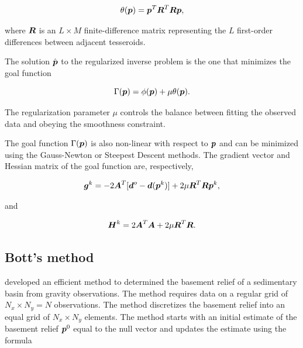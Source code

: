 \documentclass[extra]{gji}
\newcommand{\mbf}[1]{\hbox{\mathversion{bold}$#1$}}
\begin{document}
\begin{equation}
    \theta(\mbf{p}) = \mbf{p}^T\mbf{R}^T\mbf{R}\mbf{p},
\end{equation}

\noindent where $\mbf{R}$ is an $L \times M$ finite-difference matrix
representing the $L$ first-order differences between adjacent tesseroids.

The solution $\hat{\mbf{p}}$ to the regularized inverse problem is the one that
minimizes the goal function

\begin{equation}
    \Gamma(\mbf{p}) = \phi(\mbf{p}) + \mu\theta(\mbf{p}).
\end{equation}

\noindent
The regularization parameter $\mu$ controls the balance between fitting the
observed data and obeying the smoothness constraint.

The goal function $\Gamma(\mbf{p})$ is also non-linear with respect to
$\mbf{p}$ and can be minimized using the Gauss-Newton or Steepest Descent
methods.
The gradient vector and Hessian matrix of the goal function are, respectively,

\begin{equation}
    \mbf{g}^k =
        -2\mbf{A}^T[\mbf{d}^o - \mbf{d}(\mbf{p}^k)] +
        2\mu\mbf{R}^T\mbf{R}\mbf{p}^k,
    \label{eq:gradient-regul}
\end{equation}

\noindent and

\begin{equation}
    \mbf{H}^k = 2\mbf{A}^T\mbf{A} + 2\mu\mbf{R}^T\mbf{R}.
    \label{eq:hessian-regul}
\end{equation}





\subsection{Bott's method}

\citet{bott_use_1960} developed an efficient method to determined the basement
relief of a sedimentary basin from gravity observations.
The method requires data on a regular grid of $N_x \times N_y = N$
observations.
The method discretizes the basement relief into an equal grid of $N_x \times
N_y$ elements.
The method starts with an initial estimate of the basement relief
$\mbf{p}^0$ equal to the null vector and updates the estimate using the formula
\end{document}
